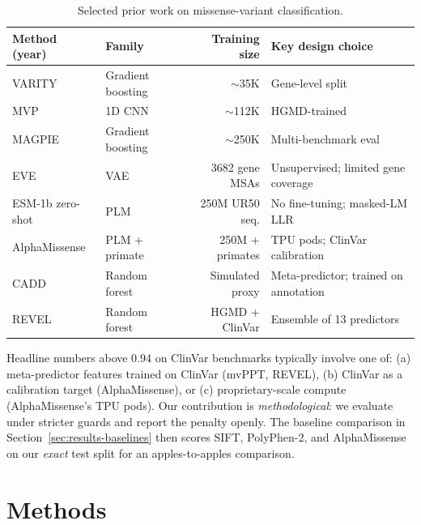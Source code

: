 \documentclass[11pt,a4paper]{article}
\begin{document}
\begin{table}[h]
\centering
\caption{Selected prior work on missense-variant classification.}
\label{tab:related}
\small
\begin{tabular}{@{} l l r l @{}}
\toprule
\textbf{Method (year)} & \textbf{Family} & \textbf{Training size} & \textbf{Key design choice} \\
\midrule
VARITY \citep{wu2021varity}        & Gradient boosting & \(\sim\)35K     & Gene-level split \\
MVP \citep{qi2021mvp}              & 1D CNN            & \(\sim\)112K    & HGMD-trained \\
MAGPIE \citep{zeng2023magpie}      & Gradient boosting & \(\sim\)250K    & Multi-benchmark eval \\
EVE \citep{frazer2021eve}          & VAE               & 3682 gene MSAs  & Unsupervised; limited gene coverage \\
ESM-1b zero-shot \citep{brandes2023esm1b} & PLM        & 250M UR50 seq.  & No fine-tuning; masked-LM LLR \\
AlphaMissense \citep{cheng2023alphamissense} & PLM + primate & 250M + primates & TPU pods; ClinVar calibration \\
CADD \citep{rentzsch2019cadd}      & Random forest     & Simulated proxy & Meta-predictor; trained on annotation \\
REVEL \citep{ioannidis2016revel}   & Random forest     & HGMD + ClinVar  & Ensemble of 13 predictors \\
\bottomrule
\end{tabular}
\end{table}

Headline numbers above 0.94 on ClinVar benchmarks typically involve
one of: (a) meta-predictor features trained on ClinVar (mvPPT,
REVEL), (b) ClinVar as a calibration target (AlphaMissense), or
(c) proprietary-scale compute (AlphaMissense's TPU pods). Our
contribution is \emph{methodological}: we evaluate under stricter
guards and report the penalty openly. The baseline comparison in
Section~\ref{sec:results-baselines} then scores SIFT, PolyPhen-2,
and AlphaMissense on our \emph{exact} test split for an
apples-to-apples comparison.

\section{Methods}
\label{sec:methods}
\end{document}
